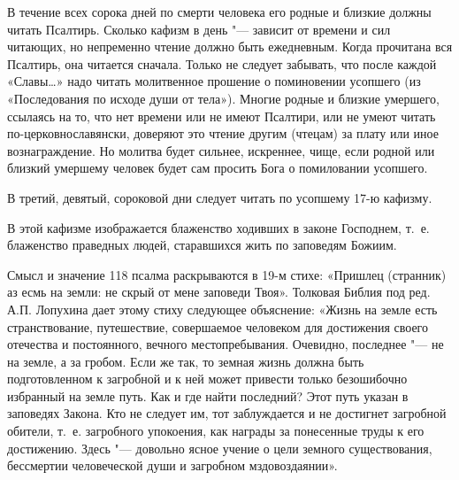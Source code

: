 \begin{mymulticols}
\end{mymulticols}

\mychapterending

\begin{mymulticols}
 

В течение всех сорока дней по смерти человека его родные и близкие должны читать Псалтирь. Сколько кафизм в день "--- зависит от времени и сил читающих, но непременно чтение должно быть ежедневным. Когда прочитана вся Псалтирь, она читается сначала. Только не следует забывать, что после каждой «Славы…» надо читать молитвенное прошение о поминовении усопшего (из «Последования по исходе души от тела»). Многие родные и близкие умершего, ссылаясь на то, что нет времени или не имеют Псалтири, или не умеют читать по-церковнославянски, доверяют это чтение другим (чтецам) за плату или иное вознаграждение. Но молитва будет сильнее, искреннее, чище, если родной или близкий умершему человек будет сам просить Бога о помиловании усопшего. 

В третий, девятый, сороковой дни следует читать по усопшему 17-ю кафизму. 

В этой кафизме изображается блаженство ходивших в законе Господнем, т.~е. блаженство праведных людей, старавшихся жить по заповедям Божиим. 

Смысл и значение 118 псалма раскрываются в 19-м стихе: «Пришлец (странник) аз есмь на земли: не скрый от мене заповеди Твоя». Толковая Библия под ред. А.П. Лопухина дает этому стиху следующее объяснение: «Жизнь на земле есть странствование, путешествие, совершаемое человеком для достижения своего отечества и постоянного, вечного местопребывания. Очевидно, последнее "--- не на земле, а за гробом. Если же так, то земная жизнь должна быть подготовленном к загробной и к ней может привести только безошибочно избранный на земле путь. Как и где найти последний? Этот путь указан в заповедях Закона. Кто не следует им, тот заблуждается и не достигнет загробной обители, т.~е. загробного упокоения, как награды за понесенные труды к его достижению. Здесь "--- довольно ясное учение о цели земного существования, бессмертии человеческой души и загробном мздовоздаянии». 

\end{mymulticols}

\mychapterending

